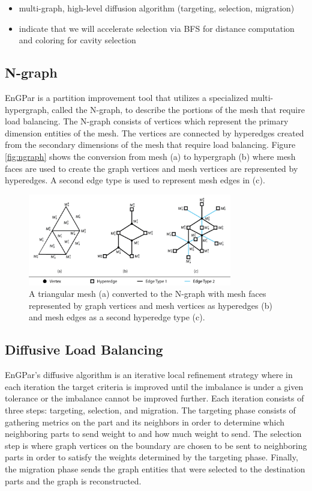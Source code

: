 \documentclass[graybox]{svmult}
\begin{document}
\begin{itemize}
  \item multi-graph, high-level diffusion algorithm (targeting, selection, migration)
  \item indicate that we will accelerate selection via BFS for distance computation and coloring for cavity selection
\end{itemize}

\subsection{N-graph}

EnGPar is a partition improvement tool that utilizes a specialized multi-hypergraph,
called the N-graph, to describe the portions of the mesh that require load balancing.
The N-graph consists of vertices which represent the primary dimension entities of the
mesh. The vertices are connected by hyperedges created from the secondary dimensions of
the mesh that require load balancing. Figure \ref{fig:ngraph} shows the conversion from
mesh (a) to hypergraph (b) where mesh faces are used to create the graph vertices and
mesh vertices are represented by hyperedges. A second edge type is used to represent mesh edges in (c). 

\begin{figure}[!ht]
  \centering
  \includegraphics[width=3.5in]{exampleMesh2Graph.png}
  \caption{A triangular mesh (a) converted to the N-graph with mesh faces represented by graph vertices and mesh vertices as hyperedges (b) and mesh edges as a second hyperedge type (c).}
  \label{fig:edgecounts}
\end{figure}


\subsection{Diffusive Load Balancing}

EnGPar's diffusive algorithm is an iterative local refinement strategy where in each
iteration the target criteria is improved until the imbalance is under a given
tolerance or the imbalance cannot be improved further. Each iteration consists of three
steps: targeting, selection, and migration. The targeting phase consists of gathering
metrics on the part and its neighbors in order to determine which neighboring parts to
send weight to and how much weight to send. The selection step is where graph vertices
on the boundary are chosen to be sent to neighboring parts in order to satisfy the
weights determined by the targeting phase. Finally, the migration phase sends the graph
entities that were selected to the destination parts and the graph is reconstructed.
\end{document}

